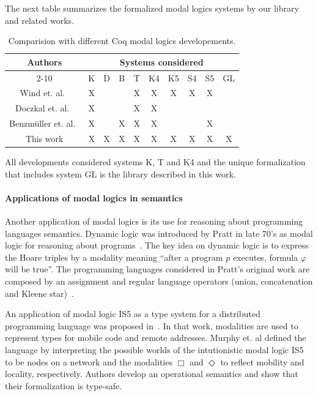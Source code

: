 \documentclass[sigconf]{acmart}
\begin{document}
The next table summarizes the formalized modal logics systems by our library
and related works.
\vspace{0.5cm} {
  \begin{table}[H]
    \begin{tabular}{|c|c|c|c|c|c|c|c|c|c|}
      \hline
      \multirow{2}{*}{Authors} & \multicolumn{9}{c|}{Systems considered} \\ \cline{2-10} 
                               & K & D & B & T & K4 & K5 & S4 & S5 & GL\\ \hline
      Wind et. al.~\cite{dewind}     & X &   &   & X & X  & X  & X  &  X & \\ \hline
      Doczkal et. al.~\cite{saarland}   & X &   &   & X & X  &    &    &  &  \\ \hline
      Benzmüller et. al.~\cite{Chris_Bruno}& X &   & X & X &  X &    &    & X &  \\ \hline
      This work         & X & X & X & X & X  &  X &  X & X  & X \\ \hline
    \end{tabular}
    \centering
    \caption{Comparision with different Coq modal logics developements.}
    \label{tab:comparacao_trabalhos_rel}
  \end{table}
}
All developments considered systems K, T and K4 and the unique formalization that
includes system GL is the library described in this work.

\paragraph{Applications of modal logics in semantics} Another application of
modal logics is its use for reasoning about programming languages semantics.
Dynamic logic was introduced by Pratt in late 70's as modal logic for reasoning
about programs~\cite{Pratt76,Pratt80}. The key idea on dynamic logic is to express the
Hoare triples by a modality meaning ``after a program $p$ executes, formula
$\varphi$ will be true''. The programming languages considered in Pratt's
original work are composed by an assignment and regular language operators
(union, concatenation and Kleene star)~\cite{Pratt76}.

An application of modal logic IS5 as a type system for a distributed
programming language was proposed in~\cite{Murphy04}. 
In that work, modalities are used to represent types for mobile code
and remote addresses. Murphy et. al defined the language by interpreting
the possible worlds of the intutionistic modal logic IS5 to be nodes on a
network and the modalities $\Box$ and $\Diamond$ to reflect mobility and
locality, respectively. Authors develop an operational semantics and show
that their formalization is type-safe.
\end{document}
